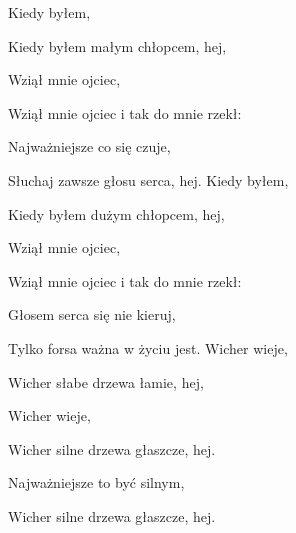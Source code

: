   \beginverse
    Kiedy byłem,

    Kiedy byłem małym chłopcem, hej,

    Wziął mnie ojciec,

    Wziął mnie ojciec i tak do mnie rzekł:

    Najważniejsze co się czuje,

    Słuchaj zawsze głosu serca, hej.
  \endverse
  \beginverse
    Kiedy byłem,

    Kiedy byłem dużym chłopcem, hej,

    Wziął mnie ojciec,

    Wziął mnie ojciec i tak do mnie rzekł:

    Głosem serca się nie kieruj,

    Tylko forsa ważna w życiu jest.
  \endverse
  \beginverse
    Wicher wieje,

    Wicher słabe drzewa łamie, hej,

    Wicher wieje,

    Wicher silne drzewa głaszcze, hej.

    Najważniejsze to być silnym,

    Wicher silne drzewa głaszcze, hej.
  \endverse
\endsong

